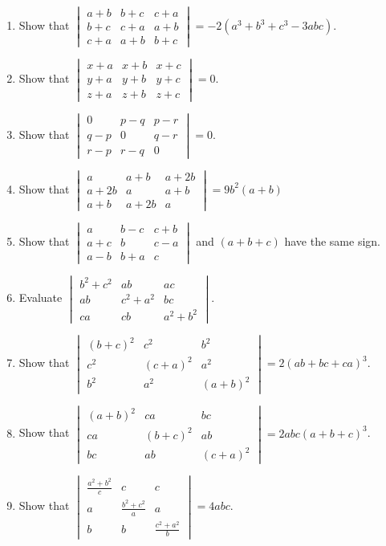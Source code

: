 \begin{enumerate}
\item Show that $\begin{vmatrix}a + b & b + c & c + a\\b + c & c + a & a + b\\c + a & a + b & b + c\end{vmatrix} = -2(a^3 + b^3 +
  c^3 - 3abc)$.
\item Show that $\begin{vmatrix}x + a & x + b & x + c\\y + a & y + b & y + c\\z + a& z + b & z + c\end{vmatrix} = 0$.
\item Show that $\begin{vmatrix}0 & p - q & p - r\\ q - p & 0 & q - r\\ r - p & r - q & 0\end{vmatrix} = 0$.
\item Show that $\begin{vmatrix}a & a + b & a + 2b\\a + 2b & a & a + b\\a + b & a + 2b & a\end{vmatrix} = 9b^2(a + b)$
\item Show that $\begin{vmatrix}a & b - c & c + b\\ a + c & b & c - a\\ a - b & b + a & c\end{vmatrix}$ and $(a + b + c)$ have the
  same sign.
\item Evaluate $\begin{vmatrix}b^2 + c^2 & ab & ac\\ab & c^2 + a^2 & bc\\ca & cb & a^2 + b^2\end{vmatrix}$.
\item Show that $\begin{vmatrix}(b + c)^2 & c^2 & b^2\\c^2 & (c + a)^2 & a^2\\b^2 & a^2 & (a + b)^2\end{vmatrix} = 2(ab + bc +
  ca)^3$.
\item Show that $\begin{vmatrix}(a + b)^2 & ca & bc\\ca & (b + c)^2 & ab\\bc & ab & (c + a)^2\end{vmatrix} = 2abc(a + b + c)^3$.
\item Show that $\begin{vmatrix}\frac{a^2 + b^2}{c} & c & c\\a & \frac{b^2 + c^2}{a} & a\\b & b & \frac{c^2 + a^2}{b}\end{vmatrix}
  = 4abc$.
\end{enumerate}


